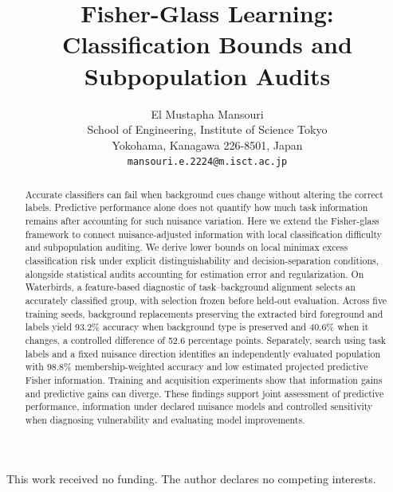 \documentclass{article}
\title{Fisher-Glass Learning: Classification Bounds and Subpopulation Audits}
\author{%
  El Mustapha Mansouri \\
  School of Engineering, Institute of Science Tokyo \\
  Yokohama, Kanagawa 226-8501, Japan \\
  \texttt{mansouri.e.2224@m.isct.ac.jp}
}
\begin{document}
\maketitle

\begin{abstract}
Accurate classifiers can fail when background cues change without altering the correct labels. Predictive performance alone does not quantify how much task information remains after accounting for such nuisance variation. Here we extend the Fisher-glass framework to connect nuisance-adjusted information with local classification difficulty and subpopulation auditing. We derive lower bounds on local minimax excess classification risk under explicit distinguishability and decision-separation conditions, alongside statistical audits accounting for estimation error and regularization. On Waterbirds, a feature-based diagnostic of task--background alignment selects an accurately classified group, with selection frozen before held-out evaluation. Across five training seeds, background replacements preserving the extracted bird foreground and labels yield 93.2\% accuracy when background type is preserved and 40.6\% when it changes, a controlled difference of 52.6 percentage points. Separately, search using task labels and a fixed nuisance direction identifies an independently evaluated population with 98.8\% membership-weighted accuracy and low estimated projected predictive Fisher information. Training and acquisition experiments show that information gains and predictive gains can diverge. These findings support joint assessment of predictive performance, information under declared nuisance models and controlled sensitivity when diagnosing vulnerability and evaluating model improvements.
\end{abstract}











\FloatBarrier
\label{end:main}

\begin{ack}
This work received no funding. The author declares no competing interests.
\end{ack}

\clearpage

\begingroup
\renewcommand{\ttdefault}{cmtt}
\setlength{\bibsep}{4pt plus 0.5pt minus 0.5pt}

\endgroup
\end{document}
